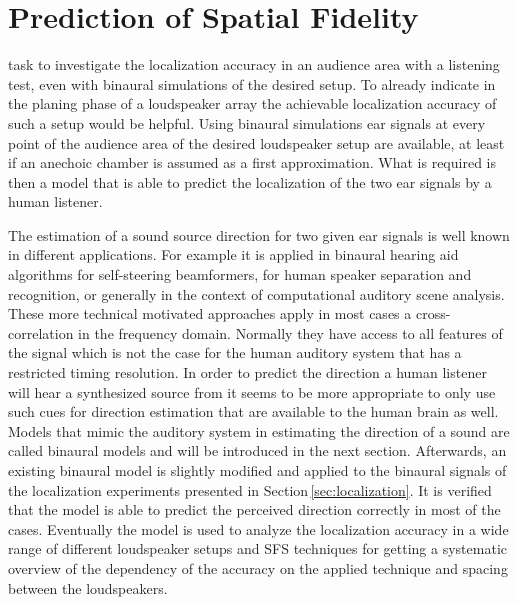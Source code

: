 \def \GITHUB {\GITHUBBASE/06_modeling}
\graphicspath{%
{\PATH/\CHAPSIX/fig6_01/}%
{\PATH/\CHAPSIX/fig6_02/}%
{\PATH/\CHAPSIX/fig6_03/}%
{\PATH/\CHAPSIX/fig6_04/}%
{\PATH/\CHAPSIX/fig6_05/}%
{\PATH/\CHAPSIX/fig6_06/}%
{\PATH/\CHAPSIX/fig6_07/}%
{\PATH/\CHAPSIX/fig6_08/}%
}

\chapter{Prediction of Spatial Fidelity}
\label{cha:modelling}
%
 task to investigate the localization accuracy
in an audience area with a listening test, even with binaural simulations of the
desired setup. To already indicate in the planing phase of a loudspeaker array
the achievable localization accuracy of such a setup would be helpful.
Using binaural simulations ear signals at every point of the
audience area of the desired loudspeaker setup are available, at least if an
anechoic chamber is assumed as a first approximation. What is required is then
a model that is able to predict the localization of the two ear signals by a human
listener.

The estimation of a sound source direction for two given ear signals
is well known in different applications. For example it is applied in
binaural hearing aid algorithms for self-steering
beamformers\autocite{Rohdenburg2008}, for human speaker separation and
recognition,\autocite{May2012} or generally in the context of
computational auditory scene analysis.\autocite{Wang2006}
These more technical motivated approaches apply in most cases a
cross-correlation in the frequency domain.\autocite[E.g.][]{Knapp1976}
Normally they have access to all features of the signal which is not the case
for the human auditory system that has a restricted timing resolution.
In order to predict the direction a human listener will hear a synthesized
source from it seems to be more appropriate to only use
such cues for direction estimation that are available to the human brain as well.
Models that mimic the auditory system in estimating the direction of a sound
are called binaural models and will be introduced in the next section.
Afterwards,
an existing binaural model is slightly modified and applied to the binaural
signals of the localization experiments presented in Section\,\ref{sec:localization}.
It is verified that the model is able to predict the perceived direction
correctly in most of the cases.
Eventually the model is used to analyze the localization accuracy in a wide range of
different loudspeaker setups and \ac{SFS} techniques for getting a systematic
overview of the dependency of the accuracy on the applied technique and spacing
between the loudspeakers.


